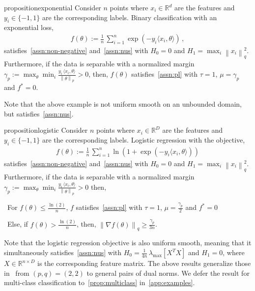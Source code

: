 \documentclass{article}
\newcommand{\normsq}[1]{\left\|#1 \right\|^{2}}
\newcommand{\norm}[1]{\left\|#1 \right\|}
\newcommand{\R}{\mathbb{R}}
\begin{document}
\begin{restatable}{proposition}{exponential}
Consider $n$ points where $x_i \in \R^d$ are the features and $y_i \in \{-1,1\}$ are the corresponding labels. Binary classification with an exponential loss,
\begin{align}
f(\theta) := \frac{1}{n} \, \sum_{i = 1}^{n} \exp(-y_i \langle x_i, \theta \rangle)    \,,
\end{align}
satisfies~\cref{assn:non-negative} and~\cref{assn:nus} with $H_0 = 0$ and $H_1 = \max_i \normsq{x_i}_q$. Furthermore, if the data is separable with a normalized margin $\gamma_p := \max_{\theta} \min_i \frac{y_i \, \langle x_i, \theta \rangle}{\norm{\theta}_p} > 0$, then, $f(\theta)$ satisfies~\cref{assn:pl} with $\tau = 1$, $\mu = \gamma_p$ and $f^* = 0$. 
\label{prop:exponential}
\end{restatable}
Note that the above example is not uniform smooth on an unbounded domain, but satisfies~\cref{assn:nus}. 
\begin{restatable}{proposition}{logistic}
Consider $n$ points where $x_i \in \R^D$ are the features and $y_i \in \{-1,1\}$ are the corresponding labels. Logistic regression with the objective, 
\begin{align}
f(\theta) := \frac{1}{n} \, \sum_{i = 1}^{n} \ln(1 + \exp(-y_i \langle x_i, \theta \rangle))    
\end{align}
satisfies~\cref{assn:non-negative} and~\cref{assn:nus} with $H_0 = 0$ and $H_1 =\max_i \normsq{x_i}_q$. Furthermore, if the data is separable with a normalized margin $\gamma_p := \max_{\theta} \min_i \frac{y_i \, \langle x_i, \theta \rangle}{\norm{\theta}_p} > 0$ then, 

\textbullet\ For $f(\theta) \leq \frac{\ln(2)}{n}$, $f$ satisfies~\cref{assn:pl} with $\tau = 1$, $\mu = \frac{\gamma_p}{2}$ and $f^* = 0$ 

\textbullet\ Else, if $f(\theta) > \frac{\ln(2)}{n}$, then, $\norm{\nabla f(\theta)}_q \geq \frac{\gamma_p}{3n}$. 
\label{prop:logistic}
\end{restatable}
Note that the logistic regression objective is also uniform smooth, meaning that it simultaneously satisfies~\cref{assn:nus} with $H_0 = \frac{1}{4n} \, \lambda_{\max}[X^T X]$ and $H_1 = 0$, where $X \in \R^{n \times D}$ is the corresponding feature matrix. The above results generalize those in~\citet{vaswani2025armijo} from $(p,q) = (2,2)$ to general pairs of dual norms. We defer the result for multi-class classification to~\cref{prop:multiclass} in~\cref{app:examples}.  
\end{document}
